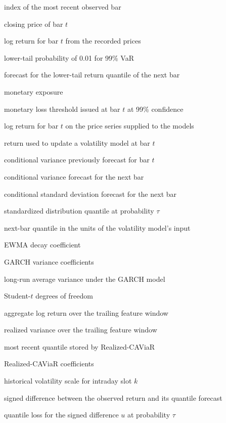 \documentclass[
	12pt,				%
	openright,			%
	twoside,			%
	a4paper,
	chapter=TITLE,
	english				%
	]{abntex2}
\begin{document}
\begin{simbolos}
  \setlength{\itemsep}{0pt}
  \setlength{\parsep}{0pt}
  \item[$t$] index of the most recent observed bar
  \item[$P_t$] closing price of bar $t$
  \item[$r_t$] log return for bar $t$ from the recorded prices
  \item[$\tau$] lower-tail probability of 0.01 for 99\% VaR
  \item[$q_{t+1}$] forecast for the lower-tail return quantile of the next bar
  \item[$E$] monetary exposure
  \item[$\operatorname{VaR}_{t}^{(0.99)}$] monetary loss threshold issued at bar $t$ at 99\% confidence
  \item[$r_t^{\mathrm{in}}$] log return for bar $t$ on the price series supplied to the models
  \item[$x_t$] return used to update a volatility model at bar $t$
  \item[$h_t$] conditional variance previously forecast for bar $t$
  \item[$h_{t+1}$] conditional variance forecast for the next bar
  \item[$\sigma_{t+1}$] conditional standard deviation forecast for the next bar
  \item[$z_\tau$] standardized distribution quantile at probability $\tau$
  \item[$\widetilde q_{t+1}$] next-bar quantile in the units of the volatility model's input
  \item[$\lambda$] EWMA decay coefficient
  \item[$\omega,a,b$] GARCH variance coefficients
  \item[$\bar h$] long-run average variance under the GARCH model
  \item[$\nu$] Student-$t$ degrees of freedom
  \item[$R_t$] aggregate log return over the trailing feature window
  \item[$RV_t$] realized variance over the trailing feature window
  \item[$q_{\mathrm{prev}}$] most recent quantile stored by Realized-CAViaR
  \item[$\beta_0,\ldots,\beta_3$] Realized-CAViaR coefficients
  \item[$s_k$] historical volatility scale for intraday slot $k$
  \item[$u$] signed difference between the observed return and its quantile forecast
  \item[$\rho_\tau(u)$] quantile loss for the signed difference $u$ at probability $\tau$
\end{simbolos}
\end{document}
